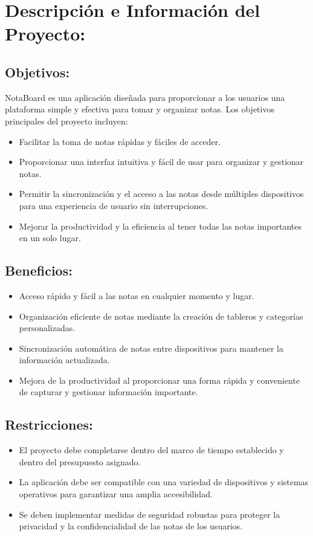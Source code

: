 \section{Descripción e Información del Proyecto:}

\subsection{Objetivos:}
NotaBoard es una aplicación diseñada para proporcionar a los usuarios una plataforma simple y efectiva para tomar y organizar notas. Los objetivos principales del proyecto incluyen:
\begin{itemize}
    \item Facilitar la toma de notas rápidas y fáciles de acceder.
    \item Proporcionar una interfaz intuitiva y fácil de usar para organizar y gestionar notas.
    \item Permitir la sincronización y el acceso a las notas desde múltiples dispositivos para una experiencia de usuario sin interrupciones.
    \item Mejorar la productividad y la eficiencia al tener todas las notas importantes en un solo lugar.
\end{itemize}

\subsection{Beneficios:}
\begin{itemize}
    \item Acceso rápido y fácil a las notas en cualquier momento y lugar.
    \item Organización eficiente de notas mediante la creación de tableros y categorías personalizadas.
    \item Sincronización automática de notas entre dispositivos para mantener la información actualizada.
    \item Mejora de la productividad al proporcionar una forma rápida y conveniente de capturar y gestionar información importante.
\end{itemize}

\subsection{Restricciones:}
\begin{itemize}
    \item El proyecto debe completarse dentro del marco de tiempo establecido y dentro del presupuesto asignado.
    \item La aplicación debe ser compatible con una variedad de dispositivos y sistemas operativos para garantizar una amplia accesibilidad.
    \item Se deben implementar medidas de seguridad robustas para proteger la privacidad y la confidencialidad de las notas de los usuarios.
\end{itemize}

